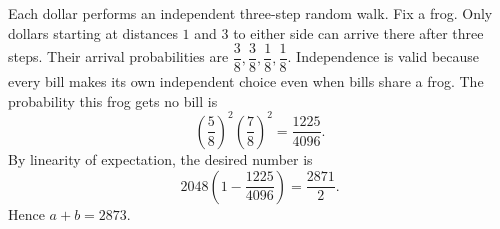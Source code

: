 Each dollar performs an independent three-step random walk. Fix a frog. Only dollars starting at distances $1$ and $3$ to either side can arrive there after three steps. Their arrival probabilities are $\dfrac{3}{8},\dfrac{3}{8},\dfrac{1}{8},\dfrac{1}{8}$. Independence is valid because every bill makes its own independent choice even when bills share a frog. The probability this frog gets no bill is
\[
(\dfrac{5}{8})^2(\dfrac{7}{8})^2=\dfrac{1225}{4096}.
\]
By linearity of expectation, the desired number is
\[
2048\left(1-\dfrac{1225}{4096}\right)=\dfrac{2871}{2}.
\]
Hence $\boxed{a+b=2873}$.
